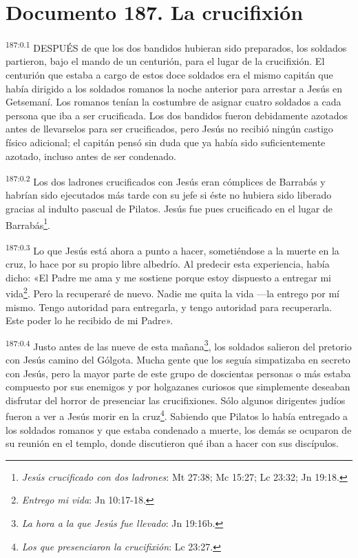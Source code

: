 \chapter{Documento 187. La crucifixión}
\par 
\textsuperscript{187:0.1} DESPUÉS de que los dos bandidos hubieran sido preparados, los soldados partieron, bajo el mando de un centurión, para el lugar de la crucifixión. El centurión que estaba a cargo de estos doce soldados era el mismo capitán que había dirigido a los soldados romanos la noche anterior para arrestar a Jesús en Getsemaní. Los romanos tenían la costumbre de asignar cuatro soldados a cada persona que iba a ser crucificada. Los dos bandidos fueron debidamente azotados antes de llevarselos para ser crucificados, pero Jesús no recibió ningún castigo físico adicional; el capitán pensó sin duda que ya había sido suficientemente azotado, incluso antes de ser condenado.

\par 
\textsuperscript{187:0.2} Los dos ladrones crucificados con Jesús eran cómplices de Barrabás y habrían sido ejecutados más tarde con su jefe si éste no hubiera sido liberado gracias al indulto pascual de Pilatos. Jesús fue pues crucificado en el lugar de Barrabás\footnote{\textit{Jesús crucificado con dos ladrones}: Mt 27:38; Mc 15:27; Lc 23:32; Jn 19:18.}.

\par 
\textsuperscript{187:0.3} Lo que Jesús está ahora a punto a hacer, sometiéndose a la muerte en la cruz, lo hace por su propio libre albedrío. Al predecir esta experiencia, había dicho: «El Padre me ama y me sostiene porque estoy dispuesto a entregar mi vida\footnote{\textit{Entrego mi vida}: Jn 10:17-18.}. Pero la recuperaré de nuevo. Nadie me quita la vida ---la entrego por mí mismo. Tengo autoridad para entregarla, y tengo autoridad para recuperarla. Este poder lo he recibido de mi Padre».

\par 
\textsuperscript{187:0.4} Justo antes de las nueve de esta mañana\footnote{\textit{La hora a la que Jesús fue llevado}: Jn 19:16b.}, los soldados salieron del pretorio con Jesús camino del Gólgota. Mucha gente que los seguía simpatizaba en secreto con Jesús, pero la mayor parte de este grupo de doscientas personas o más estaba compuesto por sus enemigos y por holgazanes curiosos que simplemente deseaban disfrutar del horror de presenciar las crucifixiones. Sólo algunos dirigentes judíos fueron a ver a Jesús morir en la cruz\footnote{\textit{Los que presenciaron la crucifixión}: Lc 23:27.}. Sabiendo que Pilatos lo había entregado a los soldados romanos y que estaba condenado a muerte, los demás se ocuparon de su reunión en el templo, donde discutieron qué iban a hacer con sus discípulos.

